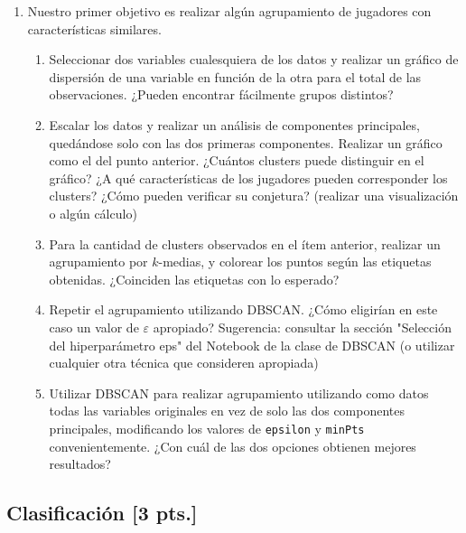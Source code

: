 \documentclass[a4paper,11pt]{article}
\theoremstyle{definition}
\begin{document}
\begin{enumerate}[resume]
\item Nuestro primer objetivo es realizar algún agrupamiento de jugadores con características similares.
\begin{enumerate}
\item Seleccionar dos variables cualesquiera de los datos y realizar un gráfico de dispersión de una variable en función de la otra para el total de las observaciones. ¿Pueden encontrar fácilmente grupos distintos?

\item Escalar los datos y realizar un análisis de componentes principales, quedándose solo con las dos primeras componentes.
Realizar un gráfico como el del punto anterior. ¿Cuántos clusters puede distinguir en el gráfico? ¿A qué características de los jugadores pueden corresponder los clusters? ¿Cómo pueden verificar su conjetura? (realizar una visualización o algún cálculo)

\item Para la cantidad de clusters observados en el \'item anterior, realizar un agrupamiento por $k$-medias, y
colorear los puntos según las etiquetas obtenidas. ¿Coinciden las etiquetas con lo esperado?

\item Repetir el agrupamiento utilizando DBSCAN. ¿Cómo eligirían en este caso un valor de $\varepsilon$ apropiado? Sugerencia: consultar la sección "Selección del hiperparámetro eps" del Notebook de la clase de DBSCAN (o utilizar cualquier otra técnica que consideren apropiada)

\item Utilizar DBSCAN para realizar agrupamiento utilizando como datos todas las variables
originales en vez de solo las dos componentes principales, modificando los valores de \verb|epsilon| y \verb|minPts|
convenientemente. ¿Con cuál de las dos opciones obtienen mejores resultados?

\end{enumerate}

\end{enumerate}

\subsection*{Clasificación [3 pts.]}
\end{document}
